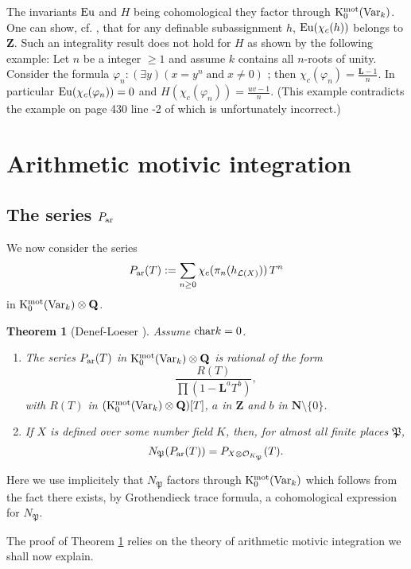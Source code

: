 \documentclass[english,12pt]{amsart}
\let\got\mathfrak
\def\gP{{\got P}}
\def\LL{{\mathbf L}}
\def\NN{{\mathbf N}}
\def\QQ{{\mathbf Q}}
\def\ZZ{{\mathbf Z}}
\def\cL{{\mathcal L}}
\def\cO{{\mathcal O}}
\newtheorem{theorem}[subsubsection]{Theorem}
\theoremstyle{definition}
\theoremstyle{remark}
\theoremstyle{plain}
\numberwithin{equation}{subsection}
\let\got\mathfrak
\def\LL{{\mathbf L}}
\def\NN{{\mathbf N}}
\def\QQ{{\mathbf Q}}
\def\ZZ{{\mathbf Z}}
\def\cL{{\mathcal L}}
\def\cO{{\mathcal O}}
\begin{document}
The invariants ${\rm Eu}$ and $H$ being cohomological they factor through
$ {\rm K}_0^{\rm mot} ({\rm Var}_{k} )$.
One can show, cf. \cite{rat}, that for any 
definable subassignment $h$, ${\rm Eu} (\chi_c (h))$ belongs to $\ZZ$.
Such an integrality result does not hold for $H$ as shown by the following example:
Let $n$ be a integer $\geq 1$ and
assume $k$ contains
all $n$-roots of unity.
Consider the formula
$\varphi_n : (\exists y) (x = y^n \; \text{and} \;
x \not= 0)$ ; then $\chi_c (\varphi_n) = \frac{\LL -1}{n}$.
In particular
${\rm Eu} (\chi_c (\varphi_n)) = 0$
and
${H} (\chi_c (\varphi_n)) = \frac{uv -1}{n}$.
(This example contradicts the example on page
430 line -2 of \cite{def}
which is unfortunately incorrect.)



\section{Arithmetic motivic integration}
\subsection{The series $P_{\rm ar}$}We now consider
the series
$$
P_{\rm ar} (T) := \sum_{n \geq 0} \chi_c (\pi_n (h_{\cL (X)})) \, T^n
$$
in
${\rm K}_0^{\rm mot} ({\rm Var}_{k}) \otimes \QQ$.

\begin{theorem}[Denef-Loeser \cite{def}]\label{Pa}
Assume ${\rm char} k = 0$.
\begin{enumerate}
\item[1)]The series 
$P_{\rm ar} (T)$
in ${\rm K}_0^{\rm mot} ({\rm Var}_{k})\otimes \QQ$ is rational of the form
$$
\frac{R (T)}{\prod (1 - \LL^a T^b)},
$$
with $R (T)$ in 
$({\rm K}_0^{\rm mot} ({\rm Var}_{k}) \otimes \QQ )[T]$, $a$ in $\ZZ$ and $b$ in $\NN \setminus \{0\}$.
\item[2)] If $X$ is defined over
some number field $K$, then, for almost
all finite places $\gP$,
$$
N_{\gP} (P_{\rm ar} (T)) = P_{X \otimes \cO_{K_{\gP}}} (T).
$$
\end{enumerate}
\end{theorem}

Here we use implicitely
that $N_{\gP}$ factors through $ {\rm K}_0^{\rm mot} ({\rm Var}_{k} )$
which follows from the fact there exists,
by Grothendieck trace formula, a cohomological
expression for $N_{\gP}$.

The proof of Theorem \ref{Pa} relies on the theory of
arithmetic motivic integration we shall now explain.
\end{document}
